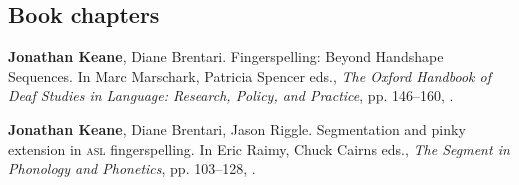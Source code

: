 \documentclass[10pt, letterpaper]{article}
\newcommand{\years}[1]{\marginpar{\scriptsize #1}}
\begin{document}
\subsection*{Book chapters}
\begin{hangparas}{1em}{1}
\-\years{2016}\textbf{Jonathan Keane}, Diane Brentari. Fingerspelling: Beyond Handshape Sequences. In Marc Marschark, Patricia Spencer eds., \textit{The Oxford Handbook of Deaf Studies in Language: Research, Policy, and Practice}, pp. 146--160, .

\-\years{2015}\textbf{Jonathan Keane}, Diane Brentari, Jason Riggle. Segmentation and pinky extension in {\textsc{asl}} fingerspelling. In Eric Raimy, Chuck Cairns eds., \textit{The Segment in Phonology and Phonetics}, pp. 103--128, .

\end{hangparas}
         
\vspace{2ex}
\end{document}
